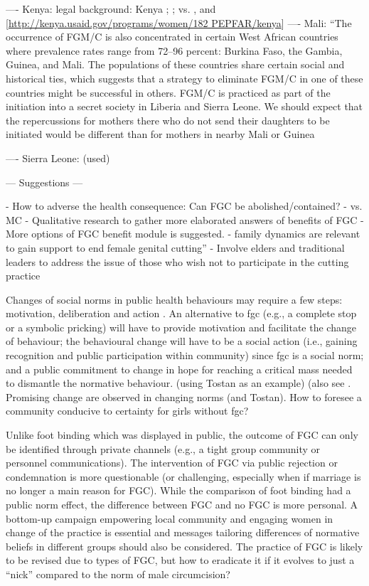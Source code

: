 \documentclass[12pt,]{article}
\begin{document}
---- Kenya: legal background:  Kenya \cite{GKEN01}; \cite{UNIC13}; 
 vs. \cite{Chia14, Hayf05}, and [\url{http://kenya.usaid.gov/programs/women/182 PEPFAR/kenya}]
---- Mali: ``The occurrence of FGM/C is also concentrated in certain West African countries where prevalence rates range from 72–96 percent: Burkina Faso, the Gambia, Guinea, and Mali. The populations of these countries share certain social and historical ties, which suggests that a strategy to eliminate FGM/C in one of these countries might be successful in others. FGM/C is practiced as part of the initiation into a secret society in Liberia and Sierra Leone. We should expect that the repercussions for mothers there who do not send their daughters to be initiated would be different than for mothers in nearby Mali or Guinea \cite{YodaWang13}

---- Sierra Leone: 
\cite{Sagn14}  (used) 


— Suggestions —

- How to adverse the health consequence:  Can FGC be abolished/contained?
- vs. MC
- Qualitative research to gather more elaborated answers of benefits of FGC
- More options of FGC benefit module is suggested.
- family dynamics are relevant to gain support to end female genital cutting”\cite{Hayf06}
- Involve elders and traditional leaders to address the issue of those who wish not to participate in the cutting practice \cite{ChegAske04, more}

Changes of social norms in public health behaviours may require a few steps:  motivation, deliberation and action \cite{CislHeis18a}.  An alternative to fgc (e.g., a complete stop or a symbolic pricking) will have to provide motivation and facilitate the change of behaviour; the behavioural change will have to be a social action (i.e., gaining recognition and public participation within community) since fgc is a social norm;  and a public commitment to change in hope for reaching a critical mass needed to dismantle the normative behaviour. (using Tostan as an example) (also see \cite{Youn15}.  Promising change are observed in changing norms \cite{EvanSnid19} (and Tostan).  How to foresee a community conducive to certainty for girls without fgc?

Unlike foot binding which was displayed in public, the outcome of FGC can only be identified through private channels (e.g., a tight group community or personnel communications).  The intervention of FGC via public rejection or condemnation is more questionable (or challenging, especially when if marriage is no longer a main reason for FGC).  While the comparison of foot binding had a public norm effect, the difference between FGC and no FGC is more personal.  A bottom-up campaign empowering local community and engaging women in change of the practice is essential \cite{BergDeni13b} and messages tailoring differences of normative beliefs in different groups should also be considered.  The practice of FGC is likely to be revised due to types of FGC, but how to eradicate it if it evolves to just a “nick” compared to the norm of male circumcision?
\end{document}
